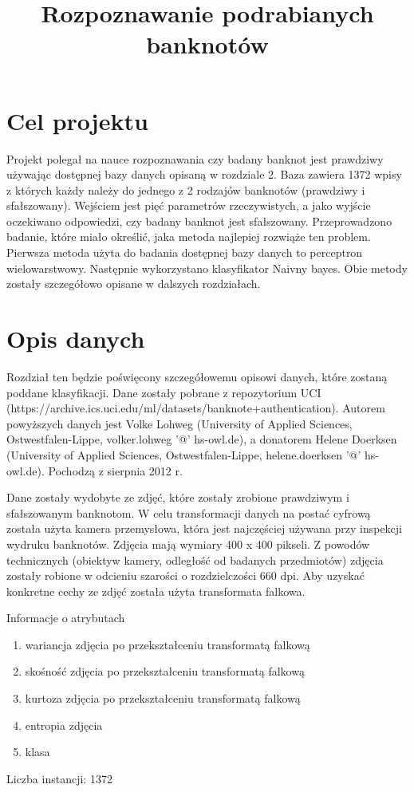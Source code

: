 \documentclass{classrep}
\author{
  \studentinfo{Norbert Landrat}{213518} \and
  \studentinfo{Adrian Grzelak}{213506}
}
\title{Rozpoznawanie podrabianych banknotów}
\begin{document}
\maketitle

\section{Cel projektu}
Projekt polegał na nauce rozpoznawania czy badany banknot jest prawdziwy używając dostępnej bazy danych opisaną w rozdziale 2. Baza zawiera 1372 wpisy z których każdy należy do jednego z 2 rodzajów banknotów (prawdziwy i sfałszowany). Wejściem jest pięć parametrów rzeczywistych, a jako wyjście oczekiwano odpowiedzi, czy badany banknot jest sfałszowany. Przeprowadzono badanie, które miało określić, jaka metoda najlepiej rozwiąże ten problem. Pierwsza metoda użyta do badania dostępnej bazy danych to perceptron wielowarstwowy. Następnie wykorzystano klasyfikator Naivny bayes. Obie metody zostały szczegółowo opisane w dalszych rozdziałach.

\section{Opis danych}
Rozdział ten będzie poświęcony szczegółowemu opisowi danych, które zostaną poddane klasyfikacji. Dane zostały pobrane z repozytorium UCI (https://archive.ics.uci.edu/ml/datasets/banknote+authentication). Autorem powyższych danych jest Volke Lohweg (University of Applied Sciences, Ostwestfalen-Lippe, volker.lohweg '@' hs-owl.de), a donatorem Helene Doerksen (University of Applied Sciences, Ostwestfalen-Lippe, helene.doerksen '@' hs-owl.de). Pochodzą z sierpnia 2012 r.

Dane zostały wydobyte ze zdjęć, które zostały zrobione prawdziwym i sfałszowanym banknotom. W celu transformacji danych na postać cyfrową została użyta kamera przemysłowa, która jest najczęściej używana przy inspekcji wydruku banknotów. Zdjęcia mają wymiary 400 x 400 pikseli. Z powodów technicznych (obiektyw kamery, odległość od badanych przedmiotów) zdjęcia zostały robione w odcieniu szarości  o rozdzielczości 660 dpi. Aby uzyskać konkretne cechy ze zdjęć została użyta transformata falkowa. 

Informacje o atrybutach
\begin{enumerate}
\item wariancja zdjęcia po przekształceniu transformatą falkową
\item skośność zdjęcia po przekształceniu transformatą falkową
\item kurtoza zdjęcia po przekształceniu transformatą falkową
\item entropia zdjęcia
\item klasa
\end{enumerate}
Liczba instancji: 1372
\end{document}
